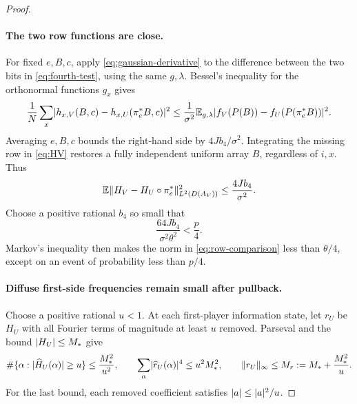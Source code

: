 \begin{proof}
\paragraph{The two row functions are close.}
For fixed $e,B,c$, apply \eqref{eq:gaussian-derivative} to the difference
between the two bits in \eqref{eq:fourth-test}, using the same $g,\lambda$.
Bessel's inequality for the orthonormal functions $g_x$ gives
\[
 \frac1N\sum_x
 \lvert h_{x,V}(B,c)-h_{x,U}(\pi_e^*B,c)\rvert^2
 \le\frac1{\sigma^2}\mathbb E_{g,\lambda}
 \lvert f_V(P(B))-f_U(P(\pi_e^*B))\rvert^2.
\]
Averaging $e,B,c$ bounds the right-hand side by $4Jb_4/\sigma^2$.
Integrating the missing row in \eqref{eq:HV} restores a fully independent
uniform array $B$, regardless of $i,x$. Thus
\begin{equation}\label{eq:row-comparison}
 \mathbb E\lVert H_V-H_U\circ\pi_e^*\rVert_{L^2(D(A_V))}^2
 \le\frac{4Jb_4}{\sigma^2}.
\end{equation}
Choose a positive rational $b_4$ so small that
\begin{equation}\label{eq:budget-choice}
 \frac{64Jb_4}{\sigma^2\theta^2}<\frac p4.
\end{equation}
Markov's inequality then makes the norm in \eqref{eq:row-comparison} less
than $\theta/4$, except on an event of probability less than $p/4$.

\paragraph{Diffuse first-side frequencies remain small after pullback.}
Choose a positive rational $u<1$. At each first-player information state,
let $r_U$ be $H_U$ with all Fourier terms of magnitude at least $u$ removed.
Parseval and the bound $\lvert H_U\rvert\le M_*$ give
\begin{equation}\label{eq:remainder-bounds}
 \#\{\alpha:\lvert\widehat H_U(\alpha)\rvert\ge u\}
 \le\frac{M_*^2}{u^2},\qquad
 \sum_\alpha\lvert\widehat r_U(\alpha)\rvert^4\le u^2M_*^2,
 \qquad
 \lVert r_U\rVert_\infty\le M_r:=M_*+\frac{M_*^2}{u}.
\end{equation}
For the last bound, each removed coefficient satisfies
$\lvert a\rvert\le\lvert a\rvert^2/u$.


\end{proof}
